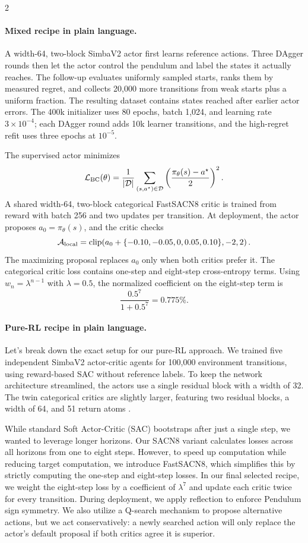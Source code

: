 \vspace{1mm}
\footnotesize
\begin{multicols}{2}
\paragraph{Mixed recipe in plain language.}
A width-64, two-block SimbaV2 actor first learns reference actions. Three DAgger rounds then let the actor control the pendulum and label the states it actually reaches. The follow-up evaluates uniformly sampled starts, ranks them by measured regret, and collects 20,000 more transitions from weak starts plus a uniform fraction. The resulting dataset contains states reached after earlier actor errors. The 400k initializer uses 80 epochs, batch 1,024, and learning rate $3{\times}10^{-4}$; each DAgger round adds 10k learner transitions, and the high-regret refit uses three epochs at $10^{-5}$.

The supervised actor minimizes
\[
\mathcal L_{\rm BC}(\theta)=
\frac{1}{|\mathcal D|}\sum_{(s,a^\star)\in\mathcal D}
\left(\frac{\pi_\theta(s)-a^\star}{2}\right)^2.
\]
A shared width-64, two-block categorical FastSACN8 critic is trained from reward with batch 256 and two updates per transition. At deployment, the actor proposes $a_0=\pi_\theta(s)$, and the critic checks
\[
\mathcal A_{\rm local}=
\operatorname{clip}\!\left(a_0+\{-0.10,-0.05,0,0.05,0.10\},-2,2\right).
\]
The maximizing proposal replaces $a_0$ only when both critics prefer it. The categorical critic loss contains one-step and eight-step cross-entropy terms. Using $w_n=\lambda^{n-1}$ with $\lambda=0.5$, the normalized coefficient on the eight-step term is
\[
\frac{0.5^7}{1+0.5^7}=0.775\%.
\]

\paragraph{Pure-RL recipe in plain language.}
Let's break down the exact setup for our pure-RL approach. We trained five independent SimbaV2 actor-critic agents for 100,000 environment transitions, using reward-based SAC without reference labels. To keep the network architecture streamlined, the actors use a single residual block with a width of 32. The twin categorical critics are slightly larger, featuring two residual blocks, a width of 64, and 51 return atoms \cite{bellemare2017distributional}.

While standard Soft Actor-Critic (SAC) bootstraps after just a single step, we wanted to leverage longer horizons. Our SACN8 variant calculates losses across all horizons from one to eight steps. However, to speed up computation while reducing target computation, we introduce FastSACN8, which simplifies this by strictly computing the one-step and eight-step losses. In our final selected recipe, we weight the eight-step loss by a coefficient of $\lambda^7$ and update each critic twice for every transition. During deployment, we apply reflection to enforce Pendulum sign symmetry. We also utilize a Q-search mechanism to propose alternative actions, but we act conservatively: a newly searched action will only replace the actor's default proposal if both critics agree it is superior.


\end{multicols}
